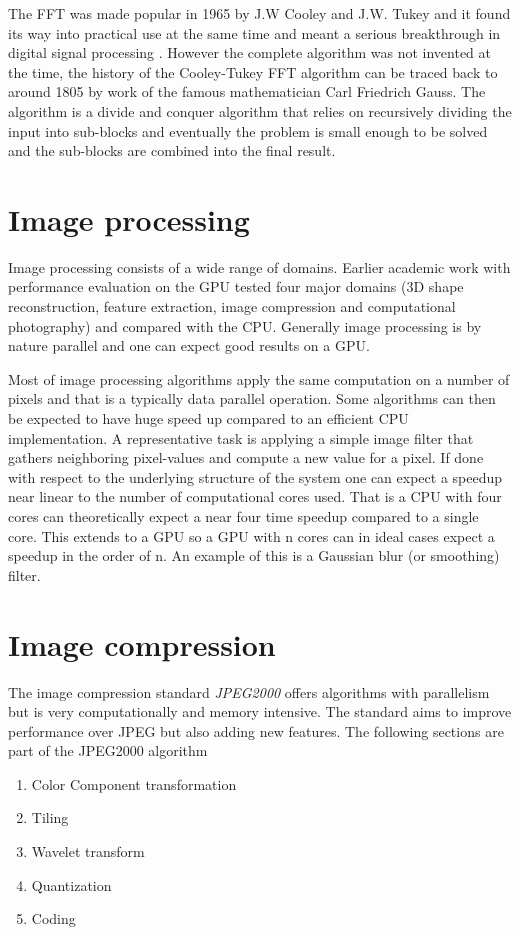 The FFT was made popular in 1965\cite{cooley1965algorithm} by J.W Cooley and J.W. Tukey and it found its way into practical use at the same time and meant a serious breakthrough in digital signal processing \cite{cooley1969fast, brigham1967fast}. However the complete algorithm was not invented at the time, the history of the Cooley-Tukey \gls{FFT} algorithm can be traced back to around 1805 by work of the famous mathematician Carl Friedrich Gauss\cite{heideman1984gauss}. The algorithm is a divide and conquer algorithm that relies on recursively dividing the input into sub-blocks and eventually the problem is small enough to be solved and the sub-blocks are combined into the final result.
\section{Image processing}
Image processing consists of a wide range of domains. Earlier academic work with performance evaluation on the \gls{GPU}\cite{park2011design} tested four major domains (\gls{3D} shape reconstruction, feature extraction, image compression and computational photography) and compared with the \gls{CPU}. Generally image processing is by nature parallel and one can expect good results on a \gls{GPU}.

Most of image processing algorithms apply the same computation on a number of pixels and that is a typically data parallel operation. Some algorithms can then be expected to have huge speed up compared to an efficient \gls{CPU} implementation. A representative task is applying a simple image filter that gathers neighboring pixel-values and compute a new value for a pixel. If done with respect to the underlying structure of the system one can expect a speedup near linear to the number of computational cores used. That is a \gls{CPU} with four cores can theoretically expect a near four time speedup compared to a single core. This extends to a \gls{GPU} so a \gls{GPU} with n cores can in ideal cases expect a speedup in the order of n. An example of this is a Gaussian blur (or smoothing) filter.

\section{Image compression}
The image compression standard \emph{JPEG2000} offers algorithms with parallelism but is very computationally and memory intensive. The standard aims to improve performance over JPEG but also adding new features. The following sections are part of the JPEG2000 algorithm\cite{christopoulos2000jpeg2000}
\begin{enumerate}
	\item Color Component transformation
	\item Tiling
	\item Wavelet transform
	\item Quantization
	\item Coding
\end{enumerate}

